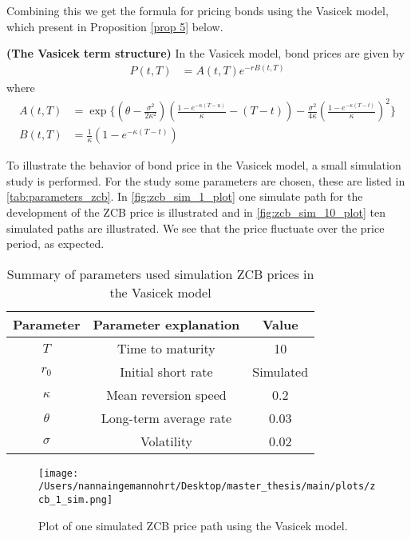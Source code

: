 \\\\
 Combining this we get the formula for pricing bonds using the Vasicek model, which present 
 in Proposition \autoref{prop 5} below. 
\newpage
\begin{proposition}
    \label{prop 5}
    \textbf{(The Vasicek term structure)} In the Vasicek model, bond prices are given by
 \begin{align}
    P(t,T) &= A(t,T) e^{-rB(t,T)} 
\end{align}
where
\begin{align*}
    A(t,T)&= \exp \Biggl\{\left(\theta-\frac{\sigma^2}{2 \kappa^2}\right)\left(\frac{1-e^{-\kappa(T-u)}}{\kappa}-(T-t)\right)
    -\frac{\sigma^2}{4 \kappa}\left(\frac{1-e^{-\kappa(T-t)}}{\kappa}\right)^2 \Biggr\} \\
    B(t,T) & =\frac{1}{\kappa} \left( 1 - e^{-\kappa (T-t)} \right)  
\end{align*}
\cite{Bjork}
\end{proposition}
\noindent
To illustrate the behavior of bond price in the Vasicek model, a small simulation study is performed. For the study 
some parameters are chosen, these are listed in \autoref{tab:parameters_zcb}. In \autoref{fig:zcb_sim_1_plot} one simulate
path for the development of the ZCB price is illustrated and in \autoref{fig:zcb_sim_10_plot} ten simulated paths are illustrated.
We see that the price fluctuate over the price period, as expected.
\\
\begin{table}[H]
    \centering
    \begin{tabular}{ccc}
      \toprule
      \textbf{Parameter} & \textbf{Parameter explanation} & \textbf{Value} \\
      \midrule
      \rowcolor{lightgray!40} $T$ & Time to maturity & 10 \\
      $r_0$ & Initial short rate & Simulated \\
      \rowcolor{lightgray!40} $\kappa$ & Mean reversion speed & 0.2\\
      $\theta$ & Long-term average rate  & 0.03 \\
      \rowcolor{lightgray!40} $\sigma$ & Volatility& 0.02 \\
      \bottomrule
    \end{tabular}
    \caption{Summary of parameters used simulation ZCB prices in the Vasicek model}
    \label{tab:parameters_zcb}
\end{table}
\noindent
\begin{figure}[H]
    \centering
    \texttt{[image: /Users/nannaingemannohrt/Desktop/master\_thesis/main/plots/zcb\_1\_sim.png]}
    \caption{Plot of one simulated ZCB price path using the Vasicek model.}
    \label{fig:zcb_sim_1_plot}
\end{figure}
